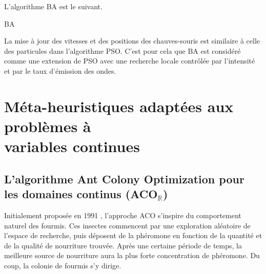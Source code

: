 \vspace{-5em}
L'algorithme BA est le suivant.

\bigskip\bigskip

\begin{algorithm}[H]
	\caption{BA}
\end{algorithm}

\vspace{3em}
\begin{spacing}{1.6}
La mise à jour des vitesses et des positions des chauves-souris est similaire à celle des particules dans l'algorithme PSO. C'est pour cela que BA est considéré comme une extension de PSO avec une recherche locale contrôlée par l'intensité et par le taux d'émission des ondes.
\end{spacing}

\section{Méta-heuristiques adaptées aux problèmes à \\ \mbox{variables} continues}
\subsection{L'algorithme Ant Colony Optimization pour les domaines continus (ACO$_\mathbb{R}$)}
Initialement proposée en 1991 \cite{dorigo2006ant}, l'approche ACO s'inspire du comportement naturel des fourmis. Ces insectes commencent par une exploration aléatoire de l'espace de recherche, puis déposent de la phéromone en fonction de la quantité et de la qualité de nourriture trouvée. Après une certaine période de temps, la meilleure source de nourriture aura la plus forte concentration de phéromone. Du coup, la colonie de fourmis s'y dirige.

